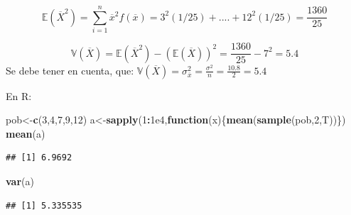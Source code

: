 \documentclass[
  ignorenonframetext,
]{beamer}
\newenvironment{Shaded}{\begin{snugshade}}{\end{snugshade}}
\newcommand{\ControlFlowTok}[1]{\textcolor[rgb]{0.13,0.29,0.53}{\textbf{#1}}}
\newcommand{\DecValTok}[1]{\textcolor[rgb]{0.00,0.00,0.81}{#1}}
\newcommand{\FloatTok}[1]{\textcolor[rgb]{0.00,0.00,0.81}{#1}}
\newcommand{\KeywordTok}[1]{\textcolor[rgb]{0.13,0.29,0.53}{\textbf{#1}}}
\newcommand{\NormalTok}[1]{#1}
\newcommand{\OperatorTok}[1]{\textcolor[rgb]{0.81,0.36,0.00}{\textbf{#1}}}
\begin{document}
\begin{frame}[fragile]{}

\[\mathbb{E}(\overline{X}^2)=\sum_{i=1}^{n} \overline{x}^2f(\overline{x})=3^2(1/25)+....+12^2(1/25)=\frac{1360}{25} \]

\[\mathbb{V}(\overline{X})= \mathbb{E}(\overline{X}^2)-(\mathbb{E}(\overline{X}))^2=\frac{1360}{25}-7^2 =5.4\]
Se debe tener en cuenta, que:
\(\displaystyle \mathbb{V}(\overline{X})=\sigma_{\overline{x}}^{2}=\frac{\sigma^2}{n}=\frac{10.8}{2}=5.4\)

En R:

\begin{Shaded}
\begin{Highlighting}[]
\NormalTok{pob<-}\KeywordTok{c}\NormalTok{(}\DecValTok{3}\NormalTok{,}\DecValTok{4}\NormalTok{,}\DecValTok{7}\NormalTok{,}\DecValTok{9}\NormalTok{,}\DecValTok{12}\NormalTok{)}
\NormalTok{a<-}\KeywordTok{sapply}\NormalTok{(}\DecValTok{1}\OperatorTok{:}\FloatTok{1e4}\NormalTok{,}\ControlFlowTok{function}\NormalTok{(x)\{}\KeywordTok{mean}\NormalTok{(}\KeywordTok{sample}\NormalTok{(pob,}\DecValTok{2}\NormalTok{,T))\})}
\KeywordTok{mean}\NormalTok{(a)}
\end{Highlighting}
\end{Shaded}

\begin{verbatim}
## [1] 6.9692
\end{verbatim}

\begin{Shaded}
\begin{Highlighting}[]
\KeywordTok{var}\NormalTok{(a)}
\end{Highlighting}
\end{Shaded}

\begin{verbatim}
## [1] 5.335535
\end{verbatim}

\end{frame}

\hypertarget{section-7}{%
\subsection{}\label{section-7}}
\end{document}
